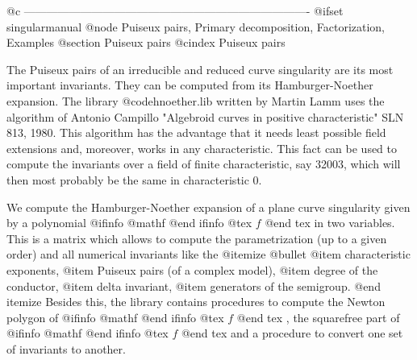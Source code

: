 @c ----------------------------------------------------------------------------
@ifset singularmanual
@node Puiseux pairs, Primary decomposition, Factorization, Examples
@section Puiseux pairs
@cindex Puiseux pairs

The Puiseux pairs of an irreducible and reduced curve singularity are
its most important invariants.  They can be computed from its
Hamburger-Noether expansion.  The library @code{hnoether.lib} written by
Martin Lamm uses the algorithm of Antonio Campillo "Algebroid curves in
positive characteristic" SLN 813, 1980.  This algorithm has the
advantage that it needs least possible field extensions and, moreover,
works in any characteristic. This fact can be used to compute the
invariants over a field of finite characteristic, say 32003, which will
then most probably be the same in characteristic 0.

We compute the Hamburger-Noether expansion of a plane curve
singularity given by a polynomial 
@ifinfo
@math{f}
@end ifinfo
@tex
$f$
@end tex
 in two variables. This is a
matrix which allows to compute the parametrization (up to a given order)
and all numerical invariants like the
@itemize @bullet
@item
    characteristic exponents,
@item
    Puiseux pairs (of a complex model),
@item
    degree of the conductor,
@item
    delta invariant,
@item
    generators of the semigroup.
@end itemize
Besides this, the library contains procedures to compute the Newton
polygon of 
@ifinfo
@math{f}
@end ifinfo
@tex
$f$
@end tex
, the squarefree part of 
@ifinfo
@math{f}
@end ifinfo
@tex
$f$
@end tex
 and a procedure to
convert one set of invariants to another.


